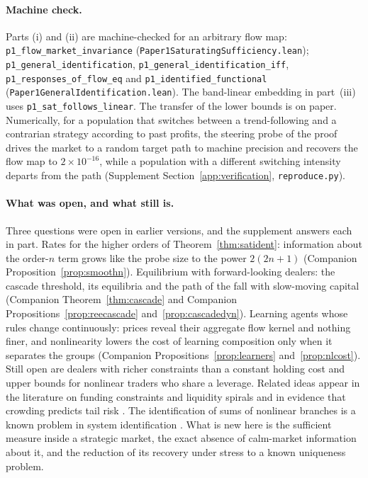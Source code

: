 \documentclass[12pt]{article}
\theoremstyle{definition}
\theoremstyle{remark}
\begin{document}
\paragraph{Machine check.} Parts (i) and (ii) are machine-checked for an arbitrary flow map: \texttt{p1\_flow\_market\_invariance} (\nolinkurl{Paper1SaturatingSufficiency.lean}); \texttt{p1\_general\_identification}, \texttt{p1\_general\_identification\_iff}, \texttt{p1\_responses\_of\_flow\_eq} and \texttt{p1\_identified\_functional} (\nolinkurl{Paper1GeneralIdentification.lean}). The band-linear embedding in part~(iii) uses \texttt{p1\_sat\_follows\_linear}. The transfer of the lower bounds is on paper. Numerically, for a population that switches between a trend-following and a contrarian strategy according to past profits, the steering probe of the proof drives the market to a random target path to machine precision and recovers the flow map to $2\times10^{-16}$, while a population with a different switching intensity departs from the path (Supplement Section~\ref{app:verification}, \nolinkurl{reproduce.py}).

\paragraph{What was open, and what still is.} Three questions were open in earlier versions, and the supplement answers each in part. Rates for the higher orders of Theorem~\ref{thm:satident}: information about the order-$n$ term grows like the probe size to the power $2(2n+1)$ (Companion Proposition~\ref{prop:smoothn}). Equilibrium with forward-looking dealers: the cascade threshold, its equilibria and the path of the fall with slow-moving capital (Companion Theorem~\ref{thm:cascade} and Companion Propositions~\ref{prop:reecascade} and~\ref{prop:cascadedyn}). Learning agents whose rules change continuously: prices reveal their aggregate flow kernel and nothing finer, and nonlinearity lowers the cost of learning composition only when it separates the groups (Companion Propositions~\ref{prop:learners} and~\ref{prop:nlcost}). Still open are dealers with richer constraints than a constant holding cost and upper bounds for nonlinear traders who share a leverage. Related ideas appear in the literature on funding constraints and liquidity spirals \citep{brunnermeier2009} and in evidence that crowding predicts tail risk \citep{barroso2022}. The identification of sums of nonlinear branches is a known problem in system identification \citep{dreesen2017}. What is new here is the sufficient measure inside a strategic market, the exact absence of calm-market information about it, and the reduction of its recovery under stress to a known uniqueness problem.
\end{document}
